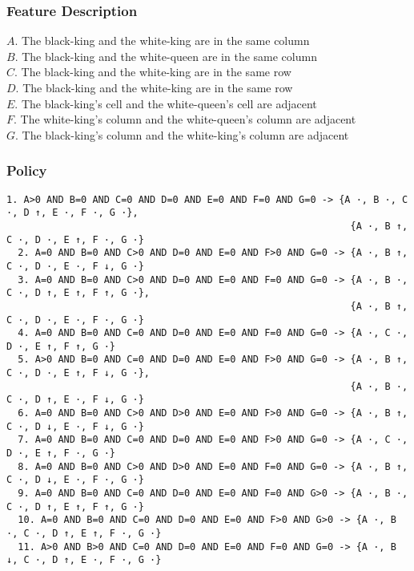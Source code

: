 \documentclass[a4paper]{article}
\begin{document}
\subsubsection{Feature Description}
$A$. The black-king and the white-king are in the same column\\
$B$. The black-king and the white-queen are in the same column\\
$C$. The black-king and the white-king are in the same row\\
$D$. The black-king and the white-king are in the same row\\
$E$. The black-king's cell and the white-queen's cell are adjacent\\
$F$. The white-king's column and the white-queen's column are adjacent\\
$G$. The black-king's column and the white-king's column are adjacent

\subsubsection{Policy}
\begin{Verbatim}[fontsize=\footnotesize]
  1. A>0 AND B=0 AND C=0 AND D=0 AND E=0 AND F=0 AND G=0 -> {A ·, B ·, C ·, D ↑, E ·, F ·, G ·},
                                                            {A ·, B ↑, C ·, D ·, E ↑, F ·, G ·}
  2. A=0 AND B=0 AND C>0 AND D=0 AND E=0 AND F>0 AND G=0 -> {A ·, B ↑, C ·, D ·, E ·, F ↓, G ·}
  3. A=0 AND B=0 AND C>0 AND D=0 AND E=0 AND F=0 AND G=0 -> {A ·, B ·, C ·, D ↑, E ↑, F ↑, G ·},
                                                            {A ·, B ↑, C ·, D ·, E ·, F ·, G ·}
  4. A=0 AND B=0 AND C=0 AND D=0 AND E=0 AND F=0 AND G=0 -> {A ·, C ·, D ·, E ↑, F ↑, G ·}
  5. A>0 AND B=0 AND C=0 AND D=0 AND E=0 AND F>0 AND G=0 -> {A ·, B ↑, C ·, D ·, E ↑, F ↓, G ·},
                                                            {A ·, B ·, C ·, D ↑, E ·, F ↓, G ·}
  6. A=0 AND B=0 AND C>0 AND D>0 AND E=0 AND F>0 AND G=0 -> {A ·, B ↑, C ·, D ↓, E ·, F ↓, G ·}
  7. A=0 AND B=0 AND C=0 AND D=0 AND E=0 AND F>0 AND G=0 -> {A ·, C ·, D ·, E ↑, F ·, G ·}
  8. A=0 AND B=0 AND C>0 AND D>0 AND E=0 AND F=0 AND G=0 -> {A ·, B ↑, C ·, D ↓, E ·, F ·, G ·}
  9. A=0 AND B=0 AND C=0 AND D=0 AND E=0 AND F=0 AND G>0 -> {A ·, B ·, C ·, D ↑, E ↑, F ↑, G ·}
  10. A=0 AND B=0 AND C=0 AND D=0 AND E=0 AND F>0 AND G>0 -> {A ·, B ·, C ·, D ↑, E ↑, F ·, G ·}
  11. A>0 AND B>0 AND C=0 AND D=0 AND E=0 AND F=0 AND G=0 -> {A ·, B ↓, C ·, D ↑, E ·, F ·, G ·}
\end{Verbatim}
\end{document}
